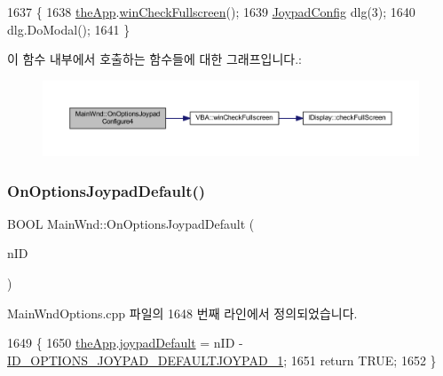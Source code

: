 \begin{DoxyCode}
1637 \{
1638   \mbox{\hyperlink{_v_b_a_8cpp_a8095a9d06b37a7efe3723f3218ad8fb3}{theApp}}.\mbox{\hyperlink{class_v_b_a_a340eaeeb7fcfc242f08ac3442d991a96}{winCheckFullscreen}}();
1639   \mbox{\hyperlink{class_joypad_config}{JoypadConfig}} dlg(3);
1640   dlg.DoModal();
1641 \}
\end{DoxyCode}
이 함수 내부에서 호출하는 함수들에 대한 그래프입니다.\+:
\nopagebreak
\begin{figure}[H]
\begin{center}
\leavevmode
\includegraphics[width=350pt]{class_main_wnd_afc6e9e67b71193dca7d906bb62ad259b_cgraph}
\end{center}
\end{figure}
\mbox{\label{class_main_wnd_a4c5c9c58649b58fb32119749fe2f2d18}} 
\subsubsection{\texorpdfstring{On\+Options\+Joypad\+Default()}{OnOptionsJoypadDefault()}}
{\footnotesize\ttfamily B\+O\+OL Main\+Wnd\+::\+On\+Options\+Joypad\+Default (\begin{DoxyParamCaption}\item[{U\+I\+NT}]{n\+ID }\end{DoxyParamCaption})}



Main\+Wnd\+Options.\+cpp 파일의 1648 번째 라인에서 정의되었습니다.


\begin{DoxyCode}
1649 \{
1650   \mbox{\hyperlink{_v_b_a_8cpp_a8095a9d06b37a7efe3723f3218ad8fb3}{theApp}}.\mbox{\hyperlink{class_v_b_a_af42f79cc8ea9f0f95bf4634c0b9224dd}{joypadDefault}} = nID - 
      \mbox{\hyperlink{resource_8h_ac515afc57e2ba0f825f5418020414d97}{ID\_OPTIONS\_JOYPAD\_DEFAULTJOYPAD\_1}};
1651   \textcolor{keywordflow}{return} TRUE;
1652 \}
\end{DoxyCode}
\mbox{\label{class_main_wnd_a53193c4dc50dce98008dfbd3644ee1ca}} 

